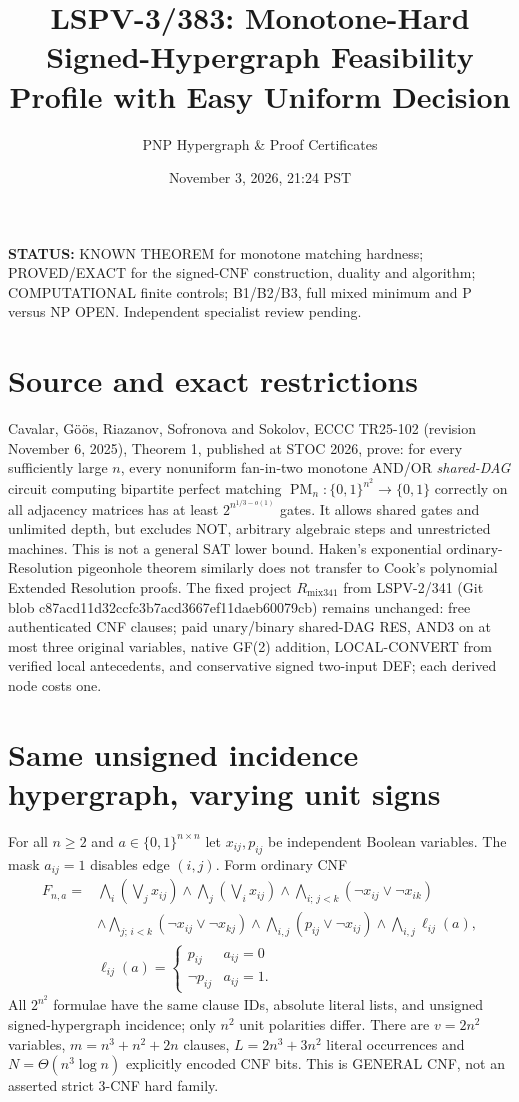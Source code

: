 \documentclass[11pt]{article}
\title{LSPV-3/383: Monotone-Hard Signed-Hypergraph Feasibility Profile with Easy Uniform Decision}
\author{PNP Hypergraph \& Proof Certificates}
\date{November 3, 2026, 21:24 PST}
\begin{document}
\maketitle
\noindent\textbf{STATUS:} KNOWN THEOREM for monotone matching hardness; PROVED/EXACT for the signed-CNF construction, duality and algorithm; COMPUTATIONAL finite controls; B1/B2/B3, full mixed minimum and P versus NP OPEN. Independent specialist review pending.

\section*{Source and exact restrictions}
Cavalar, G\"o\"os, Riazanov, Sofronova and Sokolov, ECCC TR25-102 (revision November 6, 2025), Theorem 1, published at STOC 2026, prove: for every sufficiently large $n$, every nonuniform fan-in-two monotone AND/OR \emph{shared-DAG} circuit computing bipartite perfect matching $\operatorname{PM}_n:\{0,1\}^{n^2}\to\{0,1\}$ correctly on all adjacency matrices has at least $2^{n^{1/3-o(1)}}$ gates. It allows shared gates and unlimited depth, but excludes NOT, arbitrary algebraic steps and unrestricted machines. This is not a general SAT lower bound. Haken's exponential ordinary-Resolution pigeonhole theorem similarly does not transfer to Cook's polynomial Extended Resolution proofs. The fixed project $R_{\mathrm{mix341}}$ from LSPV-2/341 (Git blob c87acd11d32ccfc3b7acd3667ef11daeb60079cb) remains unchanged: free authenticated CNF clauses; paid unary/binary shared-DAG RES, AND3 on at most three original variables, native GF(2) addition, LOCAL-CONVERT from verified local antecedents, and conservative signed two-input DEF; each derived node costs one.

\section*{Same unsigned incidence hypergraph, varying unit signs}
For all $n\ge2$ and $a\in\{0,1\}^{n\times n}$ let $x_{ij},p_{ij}$ be independent Boolean variables. The mask $a_{ij}=1$ disables edge $(i,j)$. Form ordinary CNF
\[
\begin{split}
F_{n,a}={}&\bigwedge_i(\bigvee_jx_{ij})\wedge\bigwedge_j(\bigvee_ix_{ij})
\wedge\bigwedge_{i;\,j<k}(\neg x_{ij}\vee\neg x_{ik})\\
&\wedge\bigwedge_{j;\,i<k}(\neg x_{ij}\vee\neg x_{kj})
\wedge\bigwedge_{i,j}(p_{ij}\vee\neg x_{ij})
\wedge\bigwedge_{i,j}\ell_{ij}(a),\\
&\ell_{ij}(a)=\begin{cases}p_{ij}&a_{ij}=0\\\neg p_{ij}&a_{ij}=1.\end{cases}
\end{split}
\]
All $2^{n^2}$ formulae have the same clause IDs, absolute literal lists, and unsigned signed-hypergraph incidence; only $n^2$ unit polarities differ. There are $v=2n^2$ variables, $m=n^3+n^2+2n$ clauses, $L=2n^3+3n^2$ literal occurrences and $N=\Theta(n^3\log n)$ explicitly encoded CNF bits. This is GENERAL CNF, not an asserted strict 3-CNF hard family.
\end{document}
